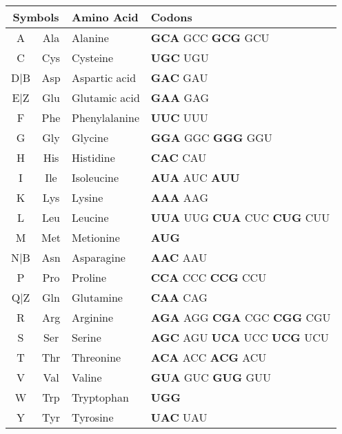 

\renewcommand{\arraystretch}{1.25}%

\begin{table}[]
\begin{center}
\begin{tabular}{|c|c|l|l|}\hline
\multicolumn{2}{|c|}{\textbf{Symbols}} & \textbf{Amino Acid} & \textbf{Codons} \\
\hline
\hline
A & Ala & Alanine & \textbf{GCA} GCC \textbf{GCG} GCU\\
\hline
C & Cys & Cysteine & \textbf{UGC} UGU\\
\hline
D|B & Asp & Aspartic acid & \textbf{GAC} GAU\\
\hline
E|Z & Glu & Glutamic acid & \textbf{GAA} GAG\\
\hline
F & Phe & Phenylalanine & \textbf{UUC} UUU\\
\hline
G & Gly & Glycine & \textbf{GGA} GGC \textbf{GGG} GGU\\
\hline
H & His & Histidine & \textbf{CAC} CAU\\
\hline
I & Ile & Isoleucine & \textbf{AUA} AUC \textbf{AUU}\\
\hline
K & Lys & Lysine & \textbf{AAA} AAG\\
\hline
L & Leu & Leucine & \textbf{UUA} UUG \textbf{CUA} CUC \textbf{CUG} CUU\\
\hline
M & Met & Metionine & \textbf{AUG}\\
\hline
N|B & Asn & Asparagine & \textbf{AAC} AAU\\
\hline
P & Pro & Proline & \textbf{CCA} CCC \textbf{CCG} CCU\\
\hline
Q|Z & Gln & Glutamine & \textbf{CAA} CAG\\
\hline
R & Arg & Arginine & \textbf{AGA} AGG \textbf{CGA} CGC \textbf{CGG} CGU\\
\hline
S & Ser & Serine & \textbf{AGC} AGU \textbf{UCA} UCC \textbf{UCG} UCU\\
\hline
T & Thr & Threonine & \textbf{ACA} ACC \textbf{ACG} ACU\\
\hline
V & Val & Valine & \textbf{GUA} GUC \textbf{GUG} GUU\\
\hline
W & Trp & Tryptophan & \textbf{UGG}\\
\hline
Y & Tyr & Tyrosine & \textbf{UAC} UAU\\

\end{tabular}
\end{center}
\end{table}
